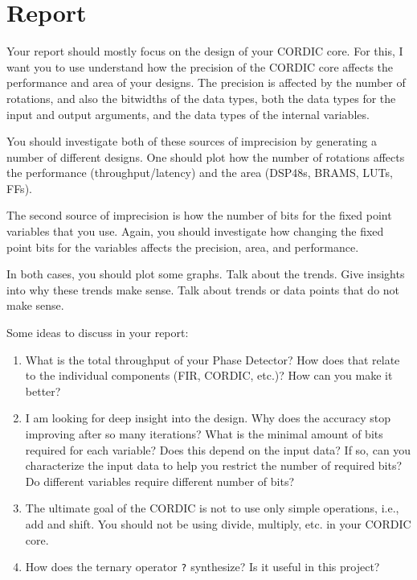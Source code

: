 \section{Report}

Your report should mostly focus on the design of your CORDIC core. For this, I want you to use understand how the precision of the CORDIC core affects the performance and area of your designs. The precision is affected by the number of rotations, and also the bitwidths of the data types, both the data types for the input and output arguments, and the data types of the internal variables. 

You should investigate both of these sources of imprecision by generating a number of different designs. One should plot how the number of rotations affects the performance (throughput/latency) and the area (DSP48s, BRAMS, LUTs, FFs). 

The second source of imprecision is how the number of bits for the fixed point variables that you use. Again, you should investigate how changing the fixed point bits for the variables affects the precision, area, and performance. 

In both cases, you should plot some graphs. Talk about the trends. Give insights into why these trends make sense. Talk about trends or data points that do not make sense.

Some ideas to discuss in your report:
\begin{enumerate}
\item What is the total throughput of your Phase Detector? How does that relate to the individual components (FIR, CORDIC, etc.)? How can you make it better?
\item I am looking for deep insight into the design. Why does the accuracy stop improving after so many iterations? What is the minimal amount of bits required for each variable? Does this depend on the input data? If so, can you characterize the input data to help you restrict the number of required bits? Do different variables require different number of bits?
\item The ultimate goal of the CORDIC is not to use only simple operations, i.e., add and shift. You should not be using divide, multiply, etc. in your CORDIC core.
\item How does the ternary operator \texttt{?} synthesize? Is it useful in this project? 
\end{enumerate}

